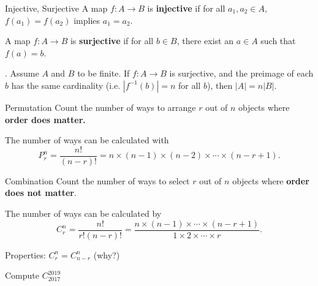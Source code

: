 
\begin{mysubsection}{}
    \begin{definition}[def:]{Injective, Surjective}
        A map $f:A\rightarrow B$ is \textbf{injective} if for all $a_1,a_2\in A$, $f(a_1)=f(a_2)$ implies $a_1=a_2$.

        A map $f:A\rightarrow B$ is \textbf{surjective} if for all $b\in B$, there exist an $a\in A$ such that $f(a)=b$.
    \end{definition}
    . Assume $A$ and $B$ to be finite. If $f:A\rightarrow B$ is surjective, and the preimage of each $b$ has the same cardinality (i.e. $|f^{-1}(b)|=n$ for all $b$), then $|A|=n|B|$.\\
\end{mysubsection}

\begin{mysubsection}{}
    \begin{definition}[def:]{Permutation}
        Count the number of ways to arrange $r$ out of $n$ objects where \textbf{order does matter.}

        The number of ways can be calculated with
        \begin{equation*}
            P^n_r=\dfrac{n!}{(n-r)!}=n\times (n-1)\times (n-2)\times \cdots\times (n-r+1).
        \end{equation*}
    \end{definition}
    \myframebreak

    \begin{definition}[def:]{Combination}
        Count the number of ways to select $r$  out of $n$ objects where \textbf{order does not matter}.

        The number of ways can be calculated by
        \begin{equation*}
            C^n_r=\dfrac{n!}{r!(n-r)!}=\dfrac{n\times (n-1)\times  \cdots\times (n-r+1)}{1\times 2\times \cdots\times r}.
        \end{equation*}
    \end{definition}

    Properties: $C^n_r = C^n_{n-r}$ (why?)

    Compute $C^{2019}_{2017}$
\end{mysubsection}

